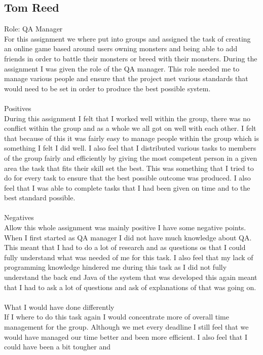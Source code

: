 \documentclass{project}
\begin{document}
\subsection{Tom Reed}
Role: QA Manager\\
For this assignment we where put into groups and assigned the task of creating an online
game based around users owning monsters and being able to add friends in order to
battle their monsters or breed with their monsters. During the assignment I was given the
role of the QA manager. This role needed me to manage various people and ensure that
the project met various standards that would need to be set in order to produce the best
possible system.
\\\\
Positives\\
During this assignment I felt that I worked well within the group, there was no conflict
within the group and as a whole we all got on well with each other. I felt that because of
this it was fairly easy to manage people within the group which is something I felt I did well.
I also feel that I distributed various tasks to members of the group fairly and efficiently by
giving the most competent person in a given area the task that fits their skill set the best.
This was something that I tried to do for every task to ensure that the best possible
outcome was produced. I also feel that I was able to complete tasks that I had been given
on time and to the best standard possible.
\\\\
Negatives\\
Allow this whole assignment was mainly positive I have some negative points. When I first
started as QA manager I did not have much knowledge about QA. This meant that I had to
do a lot of research and as questions os that I could fully understand what was needed of
me for this task. I also feel that my lack of programming knowledge hindered me during
this task as I did not fully understand the back end Java of the system that was developed
this again meant that I had to ask a lot of questions and ask of explanations of that was
going on.
\\\\
What I would have done differently\\
If I where to do this task again I would concentrate more of overall time management for
the group. Although we met every deadline I still feel that we would have managed our
time better and been more efficient. I also feel that I could have been a bit tougher and
\end{document}
